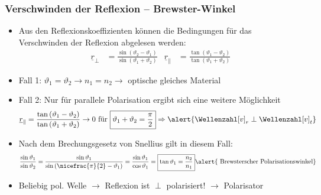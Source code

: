 \begin{frame}
  \frametitle{Verschwinden der Reflexion -- Brewster-Winkel}  
  \begin{itemize}[<+->]
  \item Aus den Reflexionskoeffizienten können die Bedingungen für das \alert{Verschwinden der Reflexion} abgelesen werden:
\begin{align*}
  \underline{r}_\perp &= \frac{\sin\left(\vartheta_2-\vartheta_1\right)}{\sin\left(\vartheta_1+\vartheta_2\right)} & \underline{r}_\parallel &= \frac{\tan\left(\vartheta_1-\vartheta_2\right)}{\tan\left(\vartheta_1+\vartheta_2\right)}
\end{align*}
\item Fall 1: \(\vartheta_1=\vartheta_2 \to n_1=n_2 \to\) \alert{optische gleiches Material}
\item Fall 2: Nur für \alert{parallele Polarisation} ergibt sich eine weitere Möglichkeit
   \begin{equation*}
     \underline{r}_\parallel = \frac{\tan\left(\vartheta_1-\vartheta_2\right)}{\tan\left(\vartheta_1+\vartheta_2\right)} \to 0 \text{ für } \boxed{\vartheta_1+\vartheta_2 = \frac{\pi}{2}} \Rightarrow \alert{\Wellenzahl[v]_r \perp \Wellenzahl[v]_t}
   \end{equation*}
\item Nach dem Brechungsgesetz von Snellius gilt in diesem Fall:
  \begin{equation*}
    \frac{\sin\vartheta_1}{\sin\vartheta_2} = \frac{\sin\vartheta_1}{\sin\left(\nicefrac{\pi}{2}-\vartheta_1\right)} = \frac{\sin\vartheta_1}{\cos\vartheta_1} = \boxed{\tan\vartheta_1=\frac{n_2}{n_1} } \alert{\text{ Brewsterscher Polarisationswinkel}}
  \end{equation*}
  \item Beliebig pol. Welle \(\to\) Reflexion ist \(\perp\) polarisiert! \(\to\) \alert{Polarisator}
\end{itemize}
\end{frame}

